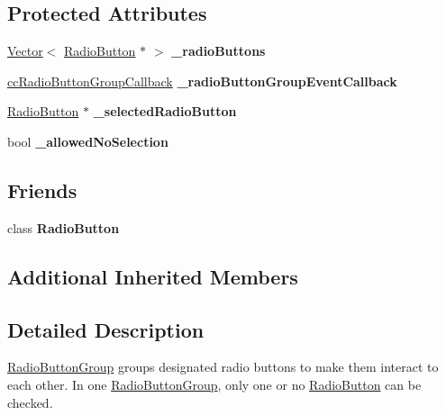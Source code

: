 \subsection*{Protected Attributes}
\begin{DoxyCompactItemize}
\item 
\mbox{\label{classui_1_1RadioButtonGroup_a99b8420a94a67de012f6d704d6c42549}} 
\hyperlink{classVector}{Vector}$<$ \hyperlink{classui_1_1RadioButton}{Radio\+Button} $\ast$ $>$ {\bfseries \+\_\+radio\+Buttons}
\item 
\mbox{\label{classui_1_1RadioButtonGroup_aa11c991af005dc6e3e35f33f4901f3b4}} 
\hyperlink{classui_1_1RadioButtonGroup_a8385f08613e843c5977252ed03c37e22}{cc\+Radio\+Button\+Group\+Callback} {\bfseries \+\_\+radio\+Button\+Group\+Event\+Callback}
\item 
\mbox{\label{classui_1_1RadioButtonGroup_a60665a254a08ba071e487f3b97161ed0}} 
\hyperlink{classui_1_1RadioButton}{Radio\+Button} $\ast$ {\bfseries \+\_\+selected\+Radio\+Button}
\item 
\mbox{\label{classui_1_1RadioButtonGroup_a128848bb1a7e161960dfeaa4456fede0}} 
bool {\bfseries \+\_\+allowed\+No\+Selection}
\end{DoxyCompactItemize}
\subsection*{Friends}
\begin{DoxyCompactItemize}
\item 
\mbox{\label{classui_1_1RadioButtonGroup_ac8ab577f4772a352b9987d8b2592ea87}} 
class {\bfseries Radio\+Button}
\end{DoxyCompactItemize}
\subsection*{Additional Inherited Members}


\subsection{Detailed Description}
\hyperlink{classui_1_1RadioButtonGroup}{Radio\+Button\+Group} groups designated radio buttons to make them interact to each other. In one \hyperlink{classui_1_1RadioButtonGroup}{Radio\+Button\+Group}, only one or no \hyperlink{classui_1_1RadioButton}{Radio\+Button} can be checked. 

